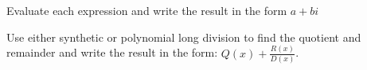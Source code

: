 \documentclass[fleqn,addpoints]{exam}
\begin{document}
  \begin{questions}

    \question Evaluate each expression and write the result in the form $a + bi$

    \question Use either synthetic or polynomial long division to find the quotient and remainder and write the result
      in the form: $Q(x) + \frac{R(x)}{D(x)}$.

      \begin{parts}
        

\end{parts}
\end{questions}
\end{document}
